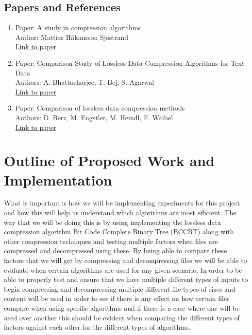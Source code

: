 \documentclass[11pt]{article}
\begin{document}
\subsection*{Papers and References}
\begin{enumerate}[(1)]
\item Paper: A study in compression algorithms \\
        Author: Mattias Håkansson Sjöstrand\\ 
        \href{http://bth.diva-portal.org/smash/record.jsf?faces-redirect=true&aq2=\%5B\%5B\%5D\%5D\&af=\%5B\%5D\&searchType=SIMPLE\&language=en\&pid=diva2\%3A830266\&aq=\%5B\%5B\%5D\%5D\&sf=all\&aqe=\%5B\%5D\&sortOrder=author\_sort\_asc\&onlyFullText=false\&noOfRows=50\&dswid=482}{Link to paper}
  
  \item Paper: Comparison Study of Lossless Data Compression Algorithms for Text Data \\
        Authors: A. Bhattacharjee, T. Bej, S. Agarwal\\ 
        \href{https://www.semanticscholar.org/paper/Comparison-Study-of-Lossless-Data-Compression-for-Bhattacharjee-Bej/ac777e46e7473c9e20ae94cceb58dcd4c058ce01}{Link to paper}
  
  \item Paper: Comparison of lossless data compression methods \\
        Authors: D. Berz, M. Engstler, M. Heindl, F. Waibel\\
        \href{https://www.researchgate.net/publication/335572104\_Comparison\_of\_lossless\_data\_compression\_methods}{Link to paper}
\end{enumerate}

\newpage
\section*{Outline of Proposed Work and Implementation}
What is important is how we will be implementing experiments for this project and how this will
help us understand which algorithms are most efficient.  The way that we will be doing this is by
using implementing the lossless data compression algorithm Bit Code Complete Binary Tree (BCCBT) 
along with other compression techniques and testing multiple factors when files are compressed and 
decompressed using these.  By being able to compare these factors that we will get by compressing and
decompressing files we will be able to evaluate when certain algorithms are used for any given scenario.
In order to be able to properly test and ensure that we have multiple different types of inputs to begin 
compressing and decompressing multiple different file types of sizes and content will be used in order to 
see if there is any effect on how certain files compare when using specific algorithms and if there is a case
where one will be used over another this should be evident when comparing the different types of 
factors against each other for the different types of algorithms.
\end{document}
